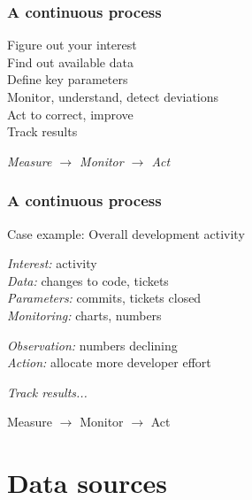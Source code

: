 \documentclass[17pt,aspectratio=169,hyperref=pdfusetitle]{beamer}
\begin{document}
\begin{frame}
\frametitle{A continuous process}

Figure out your interest \\
Find out available data \\
Define key parameters \\
Monitor, understand, detect deviations \\
Act to correct, improve \\
Track results \\

\begin{flushright}
{\em Measure $\rightarrow$ Monitor $\rightarrow$ Act}
\end{flushright}
\end{frame}


\begin{frame}
\frametitle{A continuous process}

\begin{flushright}
Case example: Overall development activity
\end{flushright}

\emph{Interest:} activity \\
\emph{Data:} changes to code, tickets \\
\emph{Parameters:} commits, tickets closed \\
\emph{Monitoring:} charts, numbers
\begin{flushright}
\emph{Observation:} numbers declining \\
\emph{Action:} allocate more developer effort \\
\end{flushright}
\emph{Track results...} \\
\begin{flushright}
Measure $\rightarrow$ Monitor $\rightarrow$ Act
\end{flushright}
\end{frame}


\section{Data sources}

\end{document}

